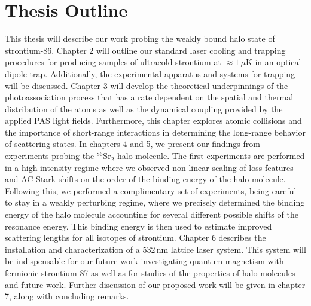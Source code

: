 \section{Thesis Outline} \label{sec:outline}
This thesis will describe our work probing the weakly bound halo state of strontium-86.
Chapter 2 will outline our standard laser cooling and trapping procedures for producing samples of ultracold strontium at $\approx1\,\mu$K in an optical dipole trap. 
Additionally, the experimental apparatus and systems for trapping will be discussed.
Chapter 3 will develop the theoretical underpinnings of the photoassociation process that has a rate dependent on the spatial and thermal distribution of the atoms as well as the dynamical coupling provided by the applied PAS light fields.
Furthermore, this chapter explores atomic collisions and the importance of short-range interactions in determining the long-range behavior of scattering states.
In chapters 4 and 5, we present our findings from experiments probing the $^{86}$Sr$_2$ halo molecule.
The first experiments are performed in a high-intensity regime where we observed non-linear scaling of loss features and AC Stark shifts on the order of the binding energy of the halo molecule.
Following this, we performed a complimentary set of experiments, being careful to stay in a weakly perturbing regime, where we precisely determined the binding energy of the halo molecule accounting for several different possible shifts of the resonance energy.
This binding energy is then used to estimate improved scattering lengths for all isotopes of strontium.
Chapter 6 describes the installation and characterization of a $532$\,nm lattice laser system.
This system will be indispensable for our future work investigating quantum magnetism with fermionic strontium-87 as well as for studies of the properties of halo molecules and future work.
Further discussion of our proposed work will be given in chapter 7, along with concluding remarks.






%
%
%
%
%
%
%
%
%

